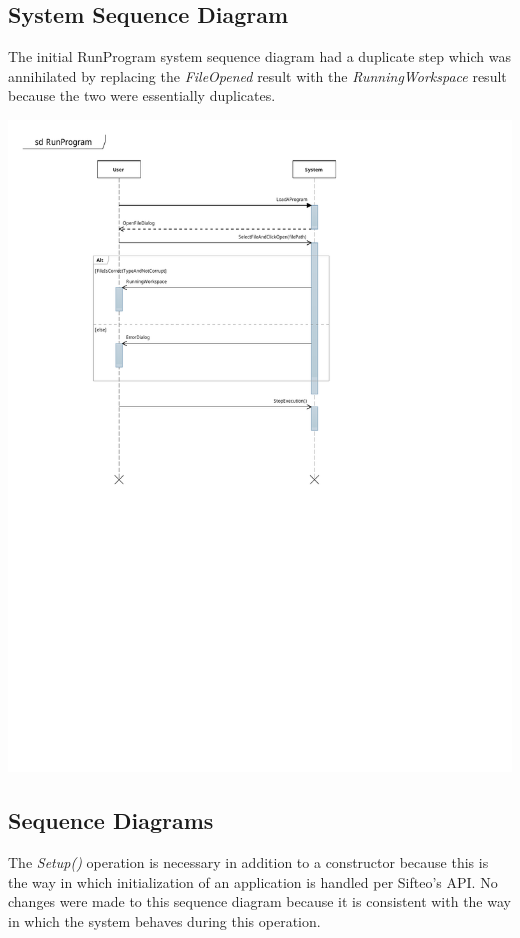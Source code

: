 \documentclass[12pt]{article}
\begin{document}
\subsection{System Sequence Diagram}

The initial RunProgram system sequence diagram had a duplicate step which was annihilated by replacing the \textit{FileOpened} result with the \textit{RunningWorkspace} result because the two were essentially duplicates.

\begin{center}
        \includegraphics[scale=1]{./pdfs/MS4Models/LoadProgram.pdf}
\end{center}

\clearpage

\subsection{Sequence Diagrams}

The \textit{Setup()} operation is necessary in addition to a constructor because this is the way in which initialization of an application is handled per Sifteo's API. No changes were made to this sequence diagram because it is consistent with the way in which the system behaves during this operation.
\end{document}
